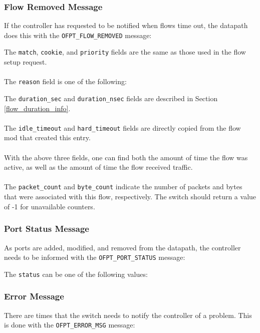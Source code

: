 
 
\subsubsection{Flow Removed Message}
If the controller has requested to be notified when flows time out, the datapath does this with the \verb|OFPT_FLOW_REMOVED| message:


The \verb|match|, \verb|cookie|, and \verb|priority| fields are the same as those used in the flow setup request.
\\\\
The \verb|reason| field is one of the following:


The \verb|duration_sec| and \verb|duration_nsec| fields are described in Section \ref{flow_duration_info}.
\\\\
The \verb|idle_timeout| and \verb|hard_timeout| fields are directly copied from the flow mod that created this entry. 
\\\\
With the above three fields, one can find both the amount of time the flow was active, as well as the amount of time the flow received traffic.
\\\\
The \verb|packet_count| and \verb|byte_count| indicate the number of packets and bytes that were associated with this flow, respectively. The switch should return a value of -1 for unavailable counters.
 
\subsubsection{Port Status Message}
As ports are added, modified, and removed from the datapath, the controller needs to be informed with the \verb|OFPT_PORT_STATUS| message:


The \verb|status| can be one of the following values:

 

\subsubsection{Error Message}
There are times that the switch needs to notify the controller of a problem.  This is done with the \verb|OFPT_ERROR_MSG| message: 	

